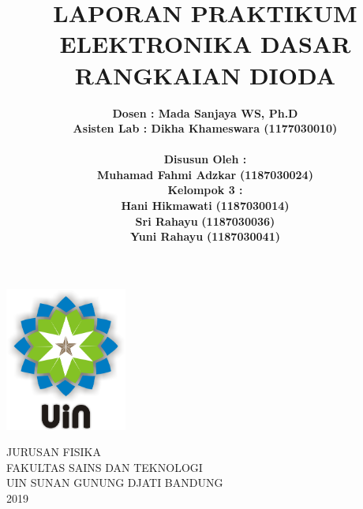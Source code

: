 \documentclass[12pt,a4paper]{article}
\begin{document}
\onehalfspacing
\begin{titlepage}

\title{\textbf{LAPORAN PRAKTIKUM ELEKTRONIKA DASAR
\\ RANGKAIAN DIODA }}  %
\author{\textbf {Dosen : Mada Sanjaya WS, Ph.D }
\\ \textbf{Asisten Lab : Dikha Khameswara (1177030010)}
\\ \textbf{ }
\\ \textbf{Disusun Oleh :}
\\ \textbf{Muhamad Fahmi Adzkar} \textbf {(1187030024)}
\\ \textbf{Kelompok 3 :}
\\ \textbf{Hani Hikmawati} \textbf {(1187030014)}
\\ \textbf{Sri Rahayu} \textbf {(1187030036)}
\\ \textbf{Yuni Rahayu} \textbf {(1187030041)}}

\maketitle
\begin{center}
\vspace{1cm}
\includegraphics[width=4cm]{uin.png}
\vspace{1cm}

JURUSAN FISIKA\\
FAKULTAS SAINS DAN TEKNOLOGI\\
UIN SUNAN GUNUNG DJATI BANDUNG\\
2019\\
\end{center}
\end{titlepage}
\end{document}
